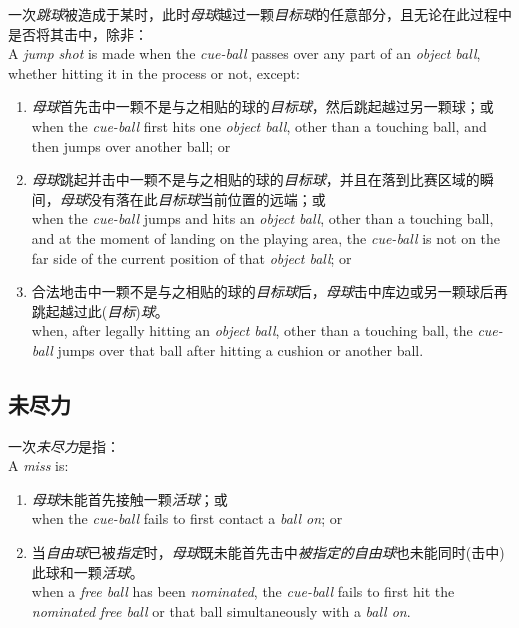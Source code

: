 \noindent 一次\emph{跳球}被造成于某时，此时\emph{母球}越过一颗\emph{目标球}的任意部分，且无论在此过程中是否将其击中，除非：\\
A \emph{jump shot} is made when the \emph{cue-ball} passes over any part of an \emph{object ball}, whether hitting it in the process or not, except:
\begin{enumerate}[label=(\alph*)]
    \item \emph{母球}首先击中一颗不是与之相贴的球的\emph{目标球}，然后跳起越过另一颗球；或\\
    when the \emph{cue-ball} first hits one \emph{object ball}, other than a touching ball, and then jumps over another ball; or
    \item \emph{母球}跳起并击中一颗不是与之相贴的球的\emph{目标球}，并且在落到比赛区域的瞬间，\emph{母球}没有落在此\emph{目标球}当前位置的远端；或\\
    when the \emph{cue-ball} jumps and hits an \emph{object ball}, other than a touching ball, and at the moment of landing on the playing area, the \emph{cue-ball} is not on the far side of the current position of that \emph{object ball}; or
    \item 合法地击中一颗不是与之相贴的球的\emph{目标球}后，\emph{母球}击中库边或另一颗球后再跳起越过此(\emph{目标})\emph{球}。\\
    when, after legally hitting an \emph{object ball}, other than a touching ball, the \emph{cue-ball} jumps over that ball after hitting a cushion or another ball.
\end{enumerate}

\subsection{未尽力}

\noindent 一次\emph{未尽力}是指：\\
A \emph{miss} is:
\begin{enumerate}[label=(\alph*)]
    \item \emph{母球}未能首先接触一颗\emph{活球}；或\\
    when the \emph{cue-ball} fails to first contact a \emph{ball on}; or
    \item 当\emph{自由球}已被\emph{指定}时，\emph{母球}既未能首先击中\emph{被指定的}\emph{自由球}也未能同时(击中)此球和一颗\emph{活球}。\\
    when a \emph{free ball} has been \emph{nominated}, the \emph{cue-ball} fails to first hit the \emph{nominated} \emph{free ball} or that ball simultaneously with a \emph{ball on}.
\end{enumerate}

